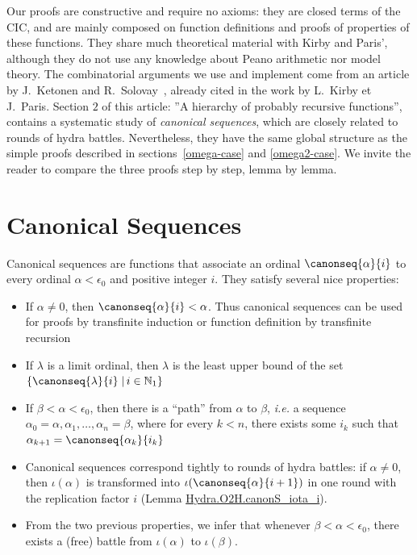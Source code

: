 Our proofs are  constructive and require no axioms: they are  closed terms of the CIC, and are mainly composed on function definitions and proofs of properties of these functions. 
They  share much theoretical material with Kirby and Paris', although they do not use any knowledge about Peano arithmetic nor model  theory.  The combinatorial arguments we use and implement
come from 
 an article by J.~Ketonen and R.~Solovay~\cite{KS81}, already  cited in the work
 by L.~Kirby et J.~Paris.%
 Section $2$ of this article: ''A hierarchy of probably recursive functions'', contains a systematic study of \emph{canonical sequences}, which are closely related to
rounds of hydra battles. 
Nevertheless, they have the same global structure as the simple proofs described in
sections~\vref{omega-case} and \vref{omega2-case}. 
We invite the reader to compare the three proofs step by step, lemma by lemma.

\section{Canonical Sequences}
\label{ketonen-solovay-sect}

Canonical sequences are functions that associate an ordinal $\canonseq{\alpha}{i}$ to every ordinal $\alpha<\epsilon_0$ and positive integer $i$. They satisfy several nice properties:

\begin{itemize}
\item If $\alpha\not=0$, then $\canonseq{\alpha}{i}<\alpha$. Thus canonical sequences can be used for proofs by transfinite induction or function definition by transfinite recursion
\item If $\lambda$ is a limit ordinal, then $\lambda$ is the least upper bound of the set 
$\{\canonseq{\lambda}{i}\;|\,i\in\mathbb{N}_1\}$


\item If $\beta<\alpha<\epsilon_0$, then there is a ``path'' from $\alpha$ to $\beta$, \emph{i.e.} a
sequence $\alpha_0=\alpha, \alpha_1, \dots, \alpha_n=\beta$, where for every $k<n$, there exists some $i_k$ such that $\alpha_{k+1}=\canonseq{\alpha_k}{i_k}$
\item Canonical sequences correspond tightly to rounds of hydra battles: if $\alpha\not=0$,
then $\iota(\alpha)$ is transformed into $\iota(\canonseq{\alpha}{i+1})$ in one round with
the replication factor $i$ (Lemma \href{../theories/html/hydras.Hydra.O2H.html\#canonS_iota_i}{Hydra.O2H.canonS\_iota\_i}).
\item From the two previous properties, we infer that whenever $\beta<\alpha<\epsilon_0$, there exists a (free) battle from $\iota(\alpha)$ to $\iota(\beta)$.
\end{itemize}

